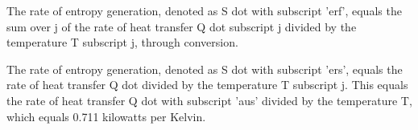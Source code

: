 The rate of entropy generation, denoted as S dot with subscript 'erf', equals the sum over j of the rate of heat transfer Q dot subscript j divided by the temperature T subscript j, through conversion.

The rate of entropy generation, denoted as S dot with subscript 'ers', equals the rate of heat transfer Q dot divided by the temperature T subscript j. This equals the rate of heat transfer Q dot with subscript 'aus' divided by the temperature T, which equals 0.711 kilowatts per Kelvin.